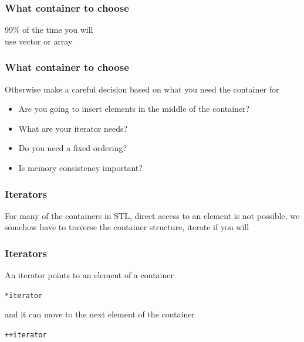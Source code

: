 \documentclass[14pt,a4paper,dvipsnames,usenames]{beamer}
\begin{document}
\begin{frame}[fragile]
  \frametitle{What container to choose}

  \begin{center}\Large
    99\% of the time you will\\use {\color{FeebleWeek}vector} or {\color{FeebleWeek}array}
  \end{center}
  
\end{frame}

\begin{frame}[fragile]
  \frametitle{What container to choose}

  Otherwise make a careful decision based on what you need the container for

  \vspace{.5em}
  \begin{itemize}
    \setlength\itemsep{.5em}
    \item Are you going to insert elements in the middle of the container?
    \item What are your iterator needs?
    \item Do you need a fixed ordering?
    \item Is memory consistency important?
  \end{itemize}

\end{frame}

\begin{frame}[fragile]
  \frametitle{Iterators}

  For many of the containers in STL, direct access to an element is not possible, we somehow have to traverse the container
  structure, iterate if you will

\end{frame}

\begin{frame}[fragile]
  \frametitle{Iterators}

  An iterator points to an element of a container

  \vspace{.5cm}
  \hspace{1cm} \lstinline!*iterator! 

  \vspace{1cm}
  and it can move to the next element of the container

  \vspace{.5cm}
  \hspace{1cm} \lstinline!++iterator!

\end{frame}
\end{document}
